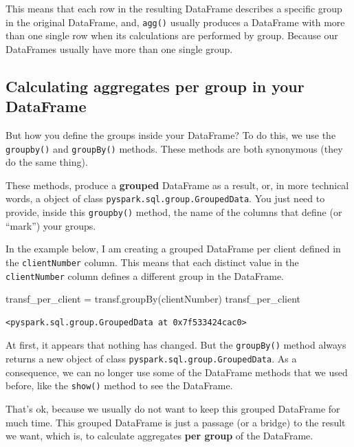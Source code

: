 \documentclass[
  11pt,
  letterpaper,
  DIV=11,
  numbers=noendperiod]{scrreprt}
\newenvironment{Shaded}{\begin{snugshade}}{\end{snugshade}}
\newcommand{\NormalTok}[1]{\textcolor[rgb]{0.00,0.23,0.31}{#1}}
\newcommand{\OperatorTok}[1]{\textcolor[rgb]{0.37,0.37,0.37}{#1}}
\newcommand{\StringTok}[1]{\textcolor[rgb]{0.13,0.47,0.30}{#1}}
\begin{document}
This means that each row in the resulting DataFrame describes a specific
group in the original DataFrame, and, \texttt{agg()} usually produces a
DataFrame with more than one single row when its calculations are
performed by group. Because our DataFrames usually have more than one
single group.

\hypertarget{calculating-aggregates-per-group-in-your-dataframe}{%
\subsection{Calculating aggregates per group in your
DataFrame}\label{calculating-aggregates-per-group-in-your-dataframe}}

But how you define the groups inside your DataFrame? To do this, we use
the \texttt{groupby()} and \texttt{groupBy()} methods. These methods are
both synonymous (they do the same thing).

These methods, produce a \textbf{grouped} DataFrame as a result, or, in
more technical words, a object of class
\texttt{pyspark.sql.group.GroupedData}. You just need to provide, inside
this \texttt{groupby()} method, the name of the columns that define (or
``mark'') your groups.

In the example below, I am creating a grouped DataFrame per client
defined in the \texttt{clientNumber} column. This means that each
distinct value in the \texttt{clientNumber} column defines a different
group in the DataFrame.

\begin{Shaded}
\begin{Highlighting}[]
\NormalTok{transf\_per\_client }\OperatorTok{=}\NormalTok{ transf.groupBy(}\StringTok{\textquotesingle{}clientNumber\textquotesingle{}}\NormalTok{)}
\NormalTok{transf\_per\_client}
\end{Highlighting}
\end{Shaded}

\begin{verbatim}
<pyspark.sql.group.GroupedData at 0x7f533424cac0>
\end{verbatim}

At first, it appears that nothing has changed. But the
\texttt{groupBy()} method always returns a new object of class
\texttt{pyspark.sql.group.GroupedData}. As a consequence, we can no
longer use some of the DataFrame methods that we used before, like the
\texttt{show()} method to see the DataFrame.

That's ok, because we usually do not want to keep this grouped DataFrame
for much time. This grouped DataFrame is just a passage (or a bridge) to
the result we want, which is, to calculate aggregates \textbf{per group}
of the DataFrame.
\end{document}
